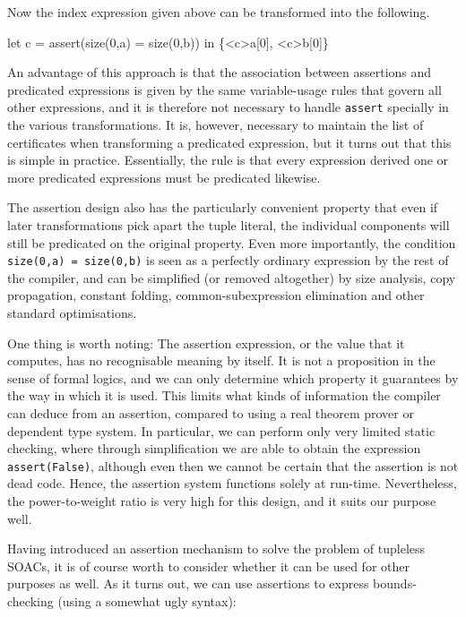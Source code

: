 Now the index expression given above can be transformed into the
following.

\begin{colorcode}
let c = assert(size(0,a) = size(0,b)) in
\{<c>a[0], <c>b[0]\}
\end{colorcode}

An advantage of this approach is that the association between
assertions and predicated expressions is given by the same
variable-usage rules that govern all other expressions, and it is
therefore not necessary to handle \texttt{assert} specially in the
various transformations.  It is, however, necessary to maintain the
list of certificates when transforming a predicated expression, but it
turns out that this is simple in practice.  Essentially, the rule is
that every expression derived one or more predicated expressions must
be predicated likewise.

The assertion design also has the particularly convenient property
that even if later transformations pick apart the tuple literal, the
individual components will still be predicated on the original
property.  Even more importantly, the condition \texttt{size(0,a) =
  size(0,b)} is seen as a perfectly ordinary expression by the rest of
the compiler, and can be simplified (or removed altogether) by size
analysis, copy propagation, constant folding, common-subexpression
elimination and other standard optimisations.

One thing is worth noting: The assertion expression, or the value that
it computes, has no recognisable meaning by itself.  It is not a
proposition in the sense of formal logics, and we can only determine
which property it guarantees by the way in which it is used.  This
limits what kinds of information the compiler can deduce from an
assertion, compared to using a real theorem prover or dependent type
system.  In particular, we can perform only very limited static
checking, where through simplification we are able to obtain the
expression \texttt{assert(False)}, although even then we cannot be
certain that the assertion is not dead code.  Hence, the assertion
system functions solely at run-time.  Nevertheless, the
power-to-weight ratio is very high for this design, and it suits our
purpose well.

Having introduced an assertion mechanism to solve the problem of
tupleless SOACs, it is of course worth to consider whether it can be
used for other purposes as well.  As it turns out, we can use
assertions to express bounds-checking (using a somewhat ugly syntax):

